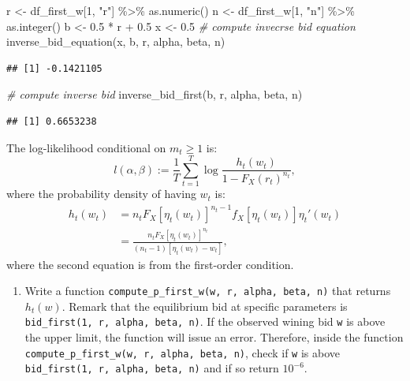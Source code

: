 \documentclass[
]{book}
\newenvironment{Shaded}{\begin{snugshade}}{\end{snugshade}}
\newcommand{\CommentTok}[1]{\textcolor[rgb]{0.56,0.35,0.01}{\textit{#1}}}
\newcommand{\DecValTok}[1]{\textcolor[rgb]{0.00,0.00,0.81}{#1}}
\newcommand{\FloatTok}[1]{\textcolor[rgb]{0.00,0.00,0.81}{#1}}
\newcommand{\FunctionTok}[1]{\textcolor[rgb]{0.00,0.00,0.00}{#1}}
\newcommand{\NormalTok}[1]{#1}
\newcommand{\OtherTok}[1]{\textcolor[rgb]{0.56,0.35,0.01}{#1}}
\newcommand{\SpecialCharTok}[1]{\textcolor[rgb]{0.00,0.00,0.00}{#1}}
\newcommand{\StringTok}[1]{\textcolor[rgb]{0.31,0.60,0.02}{#1}}
\providecommand{\tightlist}{%
  \setlength{\itemsep}{0pt}\setlength{\parskip}{0pt}}
\begin{document}
\begin{Shaded}
\begin{Highlighting}[]
\NormalTok{r }\OtherTok{\textless{}{-}}\NormalTok{ df\_first\_w[}\DecValTok{1}\NormalTok{, }\StringTok{"r"}\NormalTok{] }\SpecialCharTok{\%\textgreater{}\%}
  \FunctionTok{as.numeric}\NormalTok{()}
\NormalTok{n }\OtherTok{\textless{}{-}}\NormalTok{ df\_first\_w[}\DecValTok{1}\NormalTok{, }\StringTok{"n"}\NormalTok{] }\SpecialCharTok{\%\textgreater{}\%}
  \FunctionTok{as.integer}\NormalTok{()}
\NormalTok{b }\OtherTok{\textless{}{-}} \FloatTok{0.5} \SpecialCharTok{*}\NormalTok{ r }\SpecialCharTok{+} \FloatTok{0.5} 
\NormalTok{x }\OtherTok{\textless{}{-}} \FloatTok{0.5}
\CommentTok{\# compute invecrse bid equation}
\FunctionTok{inverse\_bid\_equation}\NormalTok{(x, b, r, alpha, beta, n)}
\end{Highlighting}
\end{Shaded}

\begin{verbatim}
## [1] -0.1421105
\end{verbatim}

\begin{Shaded}
\begin{Highlighting}[]
\CommentTok{\# compute inverse bid}
\FunctionTok{inverse\_bid\_first}\NormalTok{(b, r, alpha, beta, n)}
\end{Highlighting}
\end{Shaded}

\begin{verbatim}
## [1] 0.6653238
\end{verbatim}

The log-likelihood conditional on \(m_t \ge 1\) is:
\[
l(\alpha, \beta) := \frac{1}{T}\sum_{t = 1}^T \log \frac{h_t(w_t)}{1 - F_X(r_t)^{n_t}},
\]
where the probability density of having \(w_t\) is:
\[
\begin{split}
h_t(w_t) &= n_t F_X[\eta_t(w_t)]^{n_t - 1} f_X[\eta_t(w_t)] \eta_t'(w_t)\\
&= \frac{n_t F_X[\eta_t(w_t)]^{n_t}}{(n_t - 1)[\eta_t(w_t) - w_t]},
\end{split}
\]
where the second equation is from the first-order condition.

\begin{enumerate}
\def\labelenumi{\arabic{enumi}.}
\setcounter{enumi}{5}
\tightlist
\item
  Write a function \texttt{compute\_p\_first\_w(w,\ r,\ alpha,\ beta,\ n)} that returns \(h_t(w)\). Remark that the equilibrium bid at specific parameters is \texttt{bid\_first(1,\ r,\ alpha,\ beta,\ n)}. If the observed wining bid \texttt{w} is above the upper limit, the function will issue an error. Therefore, inside the function \texttt{compute\_p\_first\_w(w,\ r,\ alpha,\ beta,\ n)}, check if \texttt{w} is above \texttt{bid\_first(1,\ r,\ alpha,\ beta,\ n)} and if so return \(10^{-6}\).
\end{enumerate}
\end{document}
